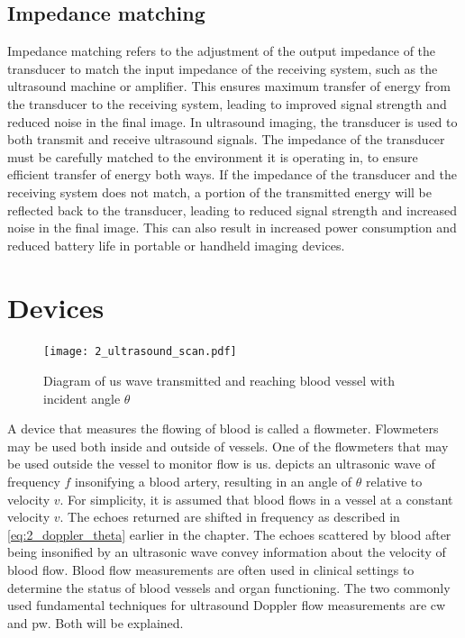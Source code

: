 \subsection{Impedance matching}
Impedance matching refers to the adjustment of the output impedance of the transducer to match the input impedance of the receiving system, such as the ultrasound machine or amplifier. This ensures maximum transfer of energy from the transducer to the receiving system, leading to improved signal strength and reduced noise in the final image. In ultrasound imaging, the transducer is used to both transmit and receive ultrasound signals. The impedance of the transducer must be carefully matched to the environment it is operating in, to ensure efficient transfer of energy both ways. If the impedance of the transducer and the receiving system does not match, a portion of the transmitted energy will be reflected back to the transducer, leading to reduced signal strength and increased noise in the final image. This can also result in increased power consumption and reduced battery life in portable or handheld imaging devices.

\section{Devices}
\begin{figure}[htbp]
	\centering
	\texttt{[image: 2\_ultrasound\_scan.pdf]}
	\caption[Diagram of ultrasound wave transmitted and reaching blood vessel with incident angle $\theta$]{Diagram of \gls{us} wave transmitted and reaching blood vessel with incident angle $\theta$ \cite{ShungUltrasound_Book}}
	\label{fig:2_ultrasound_flow_scan}
\end{figure}

A device that measures the flowing of blood is called a flowmeter. Flowmeters may be used both inside and outside of vessels. One of the flowmeters that may be used outside the vessel to monitor flow is \gls{us}.  depicts an ultrasonic wave of frequency $f$ insonifying a blood artery, resulting in an angle of $\theta$ relative to velocity $v$. For simplicity, it is assumed that blood flows in a vessel at a constant velocity $v$. The echoes returned are shifted in frequency as described in \cref{eq:2_doppler_theta} earlier in the chapter. The echoes scattered by blood after being insonified by an ultrasonic wave convey information about the velocity of blood flow. Blood flow measurements are often used in clinical settings to determine the status of blood vessels and organ functioning. The two commonly used fundamental techniques for ultrasound Doppler flow measurements are \gls{cw} and \gls{pw}. Both will be explained.

